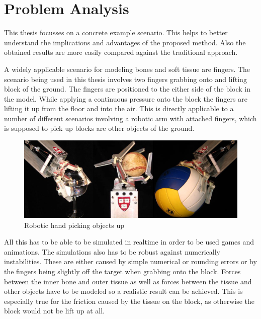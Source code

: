 \chapter{Problem Analysis}
\label{cha:problem_analysis}

This thesis focusses on a concrete example scenario. This helps to better understand the implications and advantages of the proposed method. Also the obtained results are more easily compared against the traditional approach.

A widely applicable scenario for modeling bones and soft tissue are fingers. The scenario being used in this thesis involves two fingers grabbing onto and lifting block of the ground. The fingers are positioned to the either side of the block in the model. While applying a continuous pressure onto the block the fingers are lifting it up from the floor and into the air. This is directly applicable to a number of different scenarios involving a robotic arm with attached fingers, which is supposed to pick up blocks are other objects of the ground.

\begin{figure}[htbp]
\centering
\includegraphics[width=.96\textwidth]{images/robot_grabbing.png}
\caption{Robotic hand picking objects up\protect\footnotemark}
\label{img:robot_grabbing}
\end{figure}

All this has to be able to be simulated in realtime in order to be used games and animations. The simulations also has to be robust against numerically instabilities. These are either caused by simple numerical or rounding errors or by the fingers being slightly off the target when grabbing onto the block. Forces between the inner bone and outer tissue as well as forces between the tissue and other objects have to be modeled so a realistic result can be achieved. This is especially true for the friction caused by the tissue on the block, as otherwise the block would not be lift up at all.


